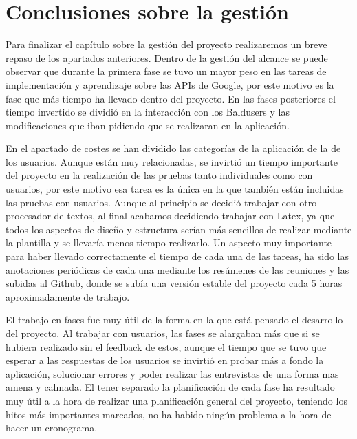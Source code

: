 \section{Conclusiones sobre la gestión}
\label{secc:Conclusiones sobre la gestión}

Para finalizar el capítulo sobre la gestión del proyecto realizaremos un breve repaso de los apartados anteriores. Dentro de la gestión del alcance se puede observar que durante la primera fase se tuvo un mayor peso en las tareas de implementación y aprendizaje sobre las APIs de Google, por este motivo es la fase que más tiempo ha llevado dentro del proyecto. En las fases posteriores el tiempo invertido se dividió en la interacción con los Baldusers y las modificaciones que iban pidiendo que se realizaran en la aplicación.

En el apartado de costes se han dividido las categorías de la aplicación de la de los usuarios. Aunque están muy relacionadas, se invirtió un tiempo importante del proyecto en la realización de las pruebas tanto individuales como con usuarios, por este motivo esa tarea es la única en la que también están incluidas las pruebas con usuarios.
Aunque al principio se decidió trabajar con otro procesador de textos, al final acabamos decidiendo trabajar con Latex, ya que todos los aspectos de diseño y estructura serían más sencillos de realizar mediante la plantilla y se llevaría menos tiempo realizarlo.
Un aspecto muy importante para haber llevado correctamente el tiempo de cada una de las tareas, ha sido las anotaciones periódicas de cada una mediante los resúmenes de las reuniones y las subidas al Github, donde se subía una versión estable del proyecto cada 5 horas aproximadamente de trabajo.

El trabajo en fases fue muy útil de la forma en la que está pensado el desarrollo del proyecto. Al trabajar con usuarios, las fases se alargaban más que si se hubiera realizado sin el feedback de estos, aunque el tiempo que se tuvo que esperar a las respuestas de los usuarios se invirtió en probar más a fondo la aplicación, solucionar errores y poder realizar las entrevistas de una forma mas amena y calmada.
El tener separado la planificación de cada fase ha resultado muy útil a la hora de realizar una planificación general del proyecto, teniendo los hitos más importantes marcados, no ha habido ningún problema a la hora de hacer un cronograma.




